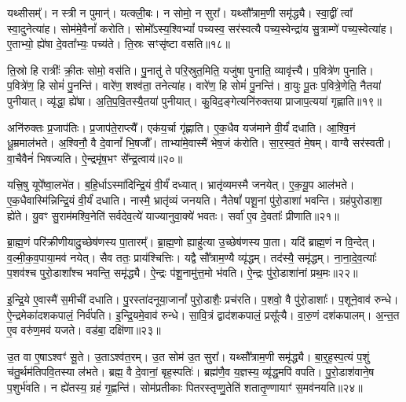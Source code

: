 यथ्सीसम्᳚।
न स्त्री न पुमान्॑।
यत्क्ली॒बः।
न सोमो॒ न सुरा᳚।
यथ्सौ᳚त्राम॒णी समृ॑द्ध्यै।
स्वा॒द्वीं त्वा᳚ स्वा॒दुनेत्या॑ह।
सोम॑मे॒वैनां᳚ करोति।
सोमो᳚\-ऽस्य॒श्विभ्यां᳚ पच्यस्व॒ सर॑स्वत्यै पच्य॒स्वेन्द्रा॑य सु॒त्राम्णे॑ पच्य॒स्वेत्या॑ह।
ए॒ताभ्यो॒ ह्ये॑षा दे॒वता᳚भ्यः॒ पच्य॑ते।
ति॒स्रः सꣳसृ॑ष्टा वसति॥१८॥\ip

ति॒स्रो हि रात्रीः᳚ क्री॒तः सोमो॒ वस॑ति।
पु॒नातु॑ ते परि॒स्रुत॒मिति॒ यजु॑षा पुनाति॒ व्यावृ॑त्त्यै।
प॒वित्रे॑ण पुनाति।
प॒वित्रे॑ण॒ हि सोमं॑ पु॒नन्ति॑।
वारे॑ण॒ शश्व॑ता॒ तनेत्या॑ह।
वारे॑ण॒ हि सोमं॑ पु॒नन्ति॑।
वा॒युः पू॒तः प॒वित्रे॒णेति॒ नैतया॑ पुनीयात्।
व्यृ॑द्धा॒ ह्ये॑षा।
अ॒ति॒प॒वि॒तस्यै॒तया॑ पुनीयात्।
कु॒विद॒ङ्गेत्यनि॑रुक्तया प्राजाप॒त्यया॑ गृह्णाति॥१९॥\ip

अनि॑रुक्तः प्र॒जा\-प॑तिः।
प्र॒जा\-प॑ते॒राप्त्यै᳚।
एक॑य॒र्चा गृ॑ह्णाति।
ए॒क॒धैव यज॑माने वी॒र्यं॑ दधाति।
आ॒श्वि॒नं धू॒म्रमाल॑भते।
अ॒श्विनौ॒ वै दे॒वानां᳚ भि॒षजौ᳚।
ताभ्या॑मे॒वास्मै॑ भेष॒जं क॑रोति।
सा॒र॒स्व॒तं मे॒षम्।
वाग्वै सर॑स्वती।
वा॒चैवैनं॑ भिषज्यति।
ऐ॒न्द्रमृ॑ष॒भꣳ से᳚न्द्र॒त्वाय॑॥२०॥\ip\anuvakamend[अक्ष्यो॒र्लोमा॑नि॒ हिर॑ण्यं वसति गृह्णाति भिषज्य॒त्येकं॑ च]

यत्त्रि॒षु यूपे᳚ष्वा॒लभे॑त।
ब॒हि॒र्धा\-ऽस्मा॑दिन्द्रि॒यं वी॒र्यं॑ दध्यात्।
भ्रातृ॑व्यमस्मै जनयेत्।
ए॒क॒यू॒प आल॑भते।
ए॒क॒धैवास्मि॑न्निन्द्रि॒यं वी॒र्यं॑ दधाति।
नास्मै॒ भ्रातृ॑व्यं जनयति।
नैतेषां᳚ पशू॒नां पु॑रो॒डाशा॑ भवन्ति।
ग्रह॑पुरोडाशा॒ ह्ये॑ते।
यु॒वꣳ सु॒राम॑मश्वि॒नेति॑ सर्वदेव॒त्ये॑ याज्यानुवा॒क्ये॑ भवतः।
सर्वा॑ ए॒व दे॒वताः᳚ प्रीणाति॥२१॥\ip

ब्रा॒ह्म॒णं परि॑क्रीणीयादु॒च्छेष॑णस्य पा॒तारम्᳚।
ब्रा॒ह्म॒णो ह्याहु॑त्या उ॒च्छेष॑णस्य पा॒ता।
यदि॑ ब्राह्म॒णं न वि॒न्देत्।
व॒ल्मी॒क॒व॒पाया॒मव॑ नयेत्।
सैव ततः॒ प्राय॑श्चित्तिः।
यद्वै सौ᳚त्राम॒ण्यै व्यृ॑द्धम्।
तद॑स्यै॒ समृ॑द्धम्।
ना॒ना॒दे॒व॒त्याः᳚ प॒शव॑श्च पुरो॒डाशा᳚श्च भवन्ति॒ समृ॑द्ध्यै।
ऐ॒न्द्रः प॑शू॒नामु॑त्त॒मो भ॑वति।
ऐ॒न्द्रः पु॑रो॒डाशा॑नां प्रथ॒मः॥२२॥\ip

इ॒न्द्रि॒ये ए॒वास्मै॑ स॒मीची॑ दधाति।
पु॒रस्ता॑दनूया॒जानां᳚ पुरो॒डाशैः॒ प्रच॑रति।
प॒शवो॒ वै पु॑रो॒डाशाः᳚।
प॒शूने॒वाव॑ रुन्धे।
ऐ॒न्द्रमेका॑\-दश\-कपालं॒ निर्व॑पति।
इ॒न्द्रि॒यमे॒वाव॑ रुन्धे।
सा॒वि॒त्रं द्वाद॑शकपालं॒ प्रसू᳚त्यै।
वा॒रु॒णं दश॑कपालम्।
अ॒न्त॒त ए॒व वरु॑ण॒मव॑ यजते।
वड॑बा॒ दक्षि॑णा॥२३॥\ip

उ॒त वा ए॒षा\-ऽश्वꣳ॑ सू॒ते।
उ॒ताऽश्व॑त॒रम्।
उ॒त सोम॑ उ॒त सुरा᳚।
यथ्सौ᳚त्राम॒णी समृ॑द्ध्यै।
बा॒र्॒ह॒स्प॒त्यं प॒शुं च॑तु॒र्थम॑तिपवि॒तस्या ल॑भते।
ब्रह्म॒ वै दे॒वानां॒ बृह॒स्पतिः॑।
ब्रह्म॑णै॒व य॒ज्ञस्य॒ व्यृ॑द्ध॒मपि॑ वपति।
पु॒रो॒डाश॑वाने॒ष प॒शुर्भ॑वति।
न ह्ये॑तस्य॒ ग्रहं॑ गृ॒ह्णन्ति॑।
सोम॑प्रतीकाः पितरस्तृप्णु॒तेति॑ शतातृ॒ण्णायाꣳ॑ स॒मव॑नयति॥२४॥\ip

